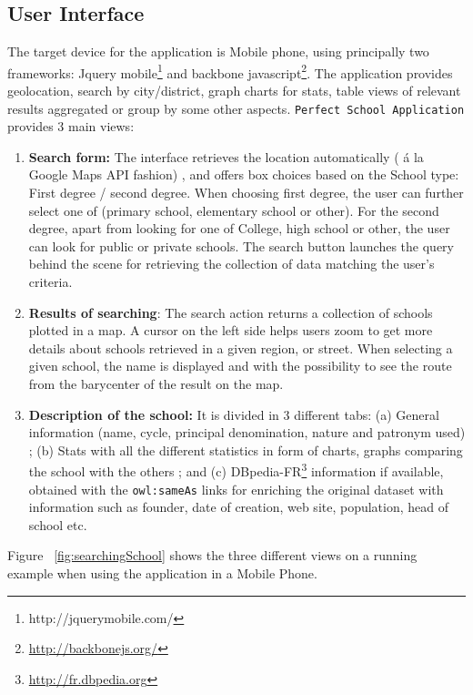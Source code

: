 \subsection{User Interface}
The target device for the application is Mobile phone, using principally two frameworks: Jquery mobile\footnote{http://jquerymobile.com/} and  backbone javascript\footnote{\url{http://backbonejs.org/}}. 
The application provides geolocation, search by city/district, graph charts for stats, table views of relevant results aggregated or group by some other aspects. 
\texttt{Perfect School Application} provides 3 main views:
\begin{enumerate}
\item \textbf{Search form:} The interface retrieves the location automatically ( \'{a} la Google Maps API fashion) , and offers box choices based on the School type: First degree / second degree. When choosing first degree, the user can further select one of (primary school, elementary school or other). For the second degree, apart from looking for one of College, high school or other, the user can look for public or private schools. The search button launches the query behind the scene for retrieving the collection of data matching the user's criteria. 

\item \textbf{Results of searching}: The search action returns a collection of schools plotted in a map. A cursor on the left side helps users zoom to get more details about schools retrieved in a given region, or street. When selecting a given school, the name is displayed and with the possibility to see the route from the barycenter of the result on the map.
\item \textbf{Description of the school:} It is divided in 3 different tabs: (a) General information (name, cycle, principal denomination, nature and patronym used) ; (b) Stats with all the different statistics in form of charts, graphs comparing the school with the others ; and (c) DBpedia-FR\footnote{\url{http://fr.dbpedia.org}} information if available, obtained with the \texttt{owl:sameAs} links for enriching the original dataset with  information such as founder, date of creation, web site, population, head of school etc.

\end{enumerate}

Figure ~\ref{fig:searchingSchool} shows the three different views on a running example when using the application in a Mobile Phone.


